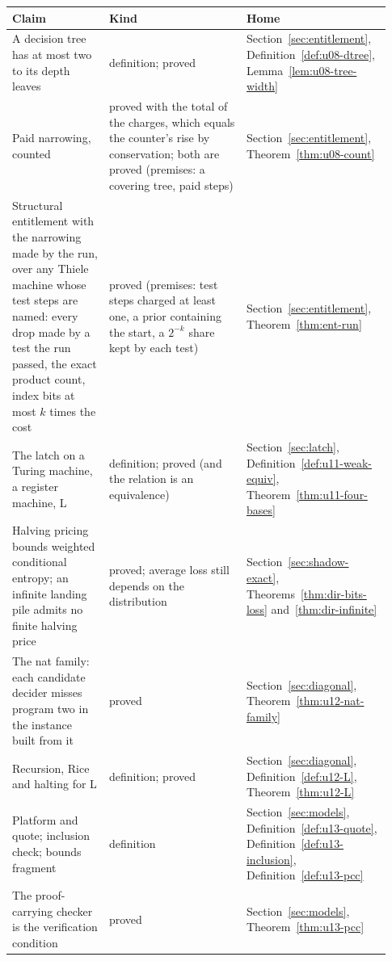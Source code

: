 \documentclass[11pt,twoside]{article}
\theoremstyle{thielethm}
\theoremstyle{thieledef}
\theoremstyle{thieledef}
\theoremstyle{thieledef}
\theoremstyle{thielethm}
\theoremstyle{thieleobs}
\theoremstyle{thielethm}
\begin{document}
\begingroup\small
\begin{longtable}{@{}>{\raggedright\arraybackslash}p{0.242\linewidth}>{\raggedright\arraybackslash}p{0.344\linewidth}>{\raggedright\arraybackslash}p{0.344\linewidth}@{}}
\toprule
\textbf{Claim} & \textbf{Kind} & \textbf{Home} \\
\midrule
\endhead
\bottomrule
\endlastfoot
A decision tree has at most two to its depth leaves & definition; proved & Section~\ref{sec:entitlement}, Definition~\ref{def:u08-dtree}, Lemma~\ref{lem:u08-tree-width} \\
Paid narrowing, counted & proved with the total of the charges, which equals the counter's rise by conservation; both are proved (premises: a covering tree, paid steps) & Section~\ref{sec:entitlement}, Theorem~\ref{thm:u08-count} \\
Structural entitlement with the narrowing made by the run, over any Thiele machine whose test steps are named: every drop made by a test the run passed, the exact product count, index bits at most $k$ times the cost & proved (premises: test steps charged at least one, a prior containing the start, a $2^{-k}$ share kept by each test) & Section~\ref{sec:entitlement}, Theorem~\ref{thm:ent-run} \\
The latch on a Turing machine, a register machine, L & definition; proved (and the relation is an equivalence) & Section~\ref{sec:latch}, Definition~\ref{def:u11-weak-equiv}, Theorem~\ref{thm:u11-four-bases} \\
Halving pricing bounds weighted conditional entropy; an infinite landing pile admits no finite halving price & proved; average loss still depends on the distribution & Section~\ref{sec:shadow-exact}, Theorems~\ref{thm:dir-bits-loss} and~\ref{thm:dir-infinite} \\
The nat family: each candidate decider misses program two in the instance built from it & proved & Section~\ref{sec:diagonal}, Theorem~\ref{thm:u12-nat-family} \\
Recursion, Rice and halting for L & definition; proved & Section~\ref{sec:diagonal}, Definition~\ref{def:u12-L}, Theorem~\ref{thm:u12-L} \\
Platform and quote; inclusion check; bounds fragment & definition & Section~\ref{sec:models}, Definition~\ref{def:u13-quote}, Definition~\ref{def:u13-inclusion}, Definition~\ref{def:u13-pcc} \\
The proof-carrying checker is the verification condition & proved & Section~\ref{sec:models}, Theorem~\ref{thm:u13-pcc} \\

\end{longtable}
\end{document}
